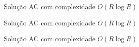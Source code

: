 \begin{frame}[fragile]{Solução AC com complexidade $O(R\log R)$}
\end{frame}

\begin{frame}[fragile]{Solução AC com complexidade $O(R\log R)$}
\end{frame}

\begin{frame}[fragile]{Solução AC com complexidade $O(R\log R)$}
\end{frame}
